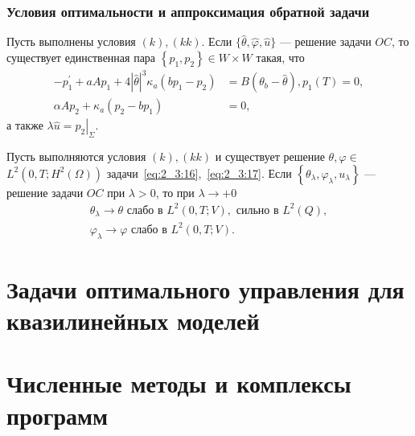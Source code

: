 \begin{frame}
    \frametitle{Условия оптимальности и аппроксимация обратной задачи}

    \begin{theorem}
        \label{th:2_3:2}
        Пусть выполнены условия $(k), (kk)$.
        Если $\{\widehat{\theta}, \widehat{\varphi}, \widehat{u}\}$ — решение задачи $OC$,
        то существует единственная пара $\left\{p_ {1}, p_{2}\right\} \in W \times W$ такая, что
        \begin{equation}
            \label{eq:2_3:15}
            \begin{aligned}
                -p_{1}^{\prime}+a A p_{1}+4|\widehat{\theta}|^{3} \kappa_{a}\left(b p_{1}
                -p_{2}\right)&=B\left(\theta_{b}-\widehat{\theta}\right),
                p_{1}(T)=0, \\
                \alpha A p_{2}+\kappa_{a}\left(p_{2}-b p_{1}\right)&=0,
            \end{aligned}
        \end{equation}
        а также $\lambda \widehat{u}=\left.p_{2}\right|_{\Sigma}$.
    \end{theorem}

    \begin{theorem}
        \label{th:2_3:3}
        Пусть выполняются условия $(k), (kk)$ и существует решение
        $\theta, \varphi \in$ $L^{2}\left(0, T ; H^{2}(\Omega) \right)$
        задачи~\eqref{eq:2_3:16},~\eqref{eq:2_3:17}.
        Если $\left\{\theta_{\lambda}, \varphi_{\lambda}, u_{\lambda}\right\}$
        — решение задачи $OC$ при $\lambda>0$, то при $\lambda\rightarrow+0$
        \[
            \begin{gathered}
                \theta_{\lambda} \rightarrow \theta \text { слабо в } L^{2}(0, T ; V),
                \text { сильно в } L^{2}(Q), \\
                \varphi_{\lambda} \rightarrow \varphi \text { слабо в } L^{2}(0, T ; V).
            \end{gathered}
        \]
    \end{theorem}
\end{frame}


\section{Задачи оптимального управления для квазилинейных моделей}\label{sec:opt}
\begin{frame}

\end{frame}


\section{Численные методы и комплексы программ}\label{sec:prog}
\begin{frame}

\end{frame}
